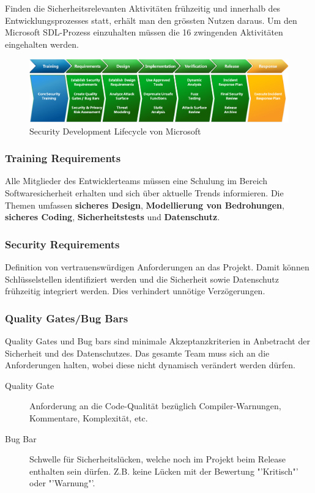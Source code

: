 Finden die Sicherheitsrelevanten Aktivitäten frühzeitig und innerhalb des Entwicklungsprozesses statt, erhält man den grössten Nutzen daraus.
Um den Microsoft SDL-Prozess einzuhalten müssen die 16 zwingenden Aktivitäten eingehalten werden.

\begin{figure}[H]
	\includegraphics[width=\textwidth]{./img/sdl-overview}
	\caption{Security Development Lifecycle von Microsoft}
\end{figure}

\subsubsection{Training Requirements}
Alle Mitglieder des Entwicklerteams müssen eine Schulung im Bereich Softwaresicherheit erhalten und sich über aktuelle Trends informieren. Die Themen umfassen \textbf{sicheres Design}, \textbf{Modellierung von Bedrohungen}, \textbf{sicheres Coding}, \textbf{Sicherheitstests} und \textbf{Datenschutz}.

\subsubsection{Security Requirements}
Definition von vertrauenswürdigen Anforderungen an das Projekt. Damit können Schlüsselstellen identifiziert werden und die Sicherheit sowie Datenschutz frühzeitig integriert werden. Dies verhindert unnötige Verzögerungen.

\subsubsection{Quality Gates/Bug Bars}
Quality Gates und Bug bars sind minimale Akzeptanzkriterien in Anbetracht der Sicherheit und des Datenschutzes. Das gesamte Team muss sich an die Anforderungen halten, wobei diese nicht dynamisch verändert werden dürfen.
\begin{description}
	\item[Quality Gate] Anforderung an die Code-Qualität bezüglich Compiler-Warnungen, Kommentare, Komplexität, etc.
	\item[Bug Bar] Schwelle für Sicherheitslücken, welche noch im Projekt beim Release enthalten sein dürfen. Z.B. keine Lücken mit der Bewertung "'Kritisch"' oder "'Warnung"'.
\end{description}

